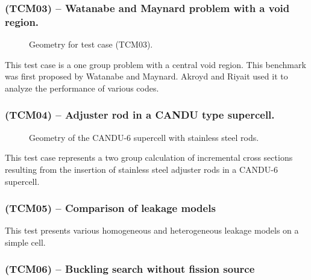 
\subsubsection{\tst(TCM03) -- Watanabe and Maynard problem with a void region.}

\begin{figure}[h!]  
\begin{center} 
\epsfxsize=10cm \centerline{ }
\parbox{14cm}{\caption{Geometry for test case \tst(TCM03).}
\label{fig:TCM03}}     \end{center}    \end{figure}

This test case is a one group problem with a central void region. This benchmark
was first proposed by  Watanabe and Maynard. Akroyd and Riyait used it to
analyze the performance of various codes.\cite{DragonPIJS2,DragonPIJS3,Akroyd}


\subsubsection{\tst(TCM04) -- Adjuster rod in a CANDU type supercell.}

\begin{figure}[h!]  
\begin{center} 
\epsfxsize=10cm \centerline{ }
\parbox{14cm}{\caption{Geometry of the CANDU-6 supercell with stainless steel
rods.}\label{fig:TCM04}}   
\end{center}  
\end{figure}

This test case represents a two group calculation of incremental cross sections
resulting from  the insertion of stainless steel adjuster rods in a CANDU-6
supercell.


\subsubsection{\tst(TCM05) -- Comparison of leakage models}

This test presents various homogeneous and heterogeneous leakage models on a
simple cell.


\subsubsection{\tst(TCM06) -- Buckling search without fission source}


